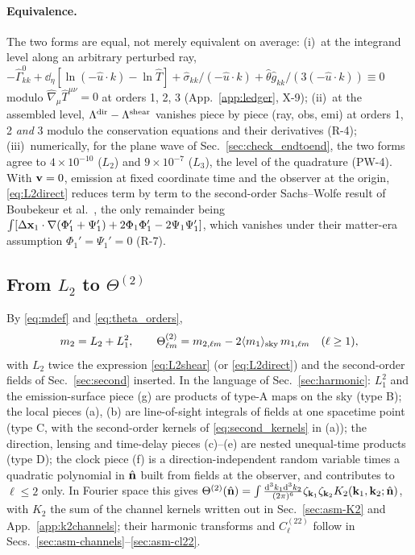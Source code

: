 \paragraph{Equivalence.}  The two forms are equal, not merely equivalent on average:
(i)~at the integrand level along an arbitrary perturbed ray, $-\hat\Gamma^0_{kk}+\dd_\eta[\ln(-\hat u\cdot k)-\ln\hat T]+\hat\sigma_{kk}/(-\hat u\cdot k)
+\hat\theta\hat g_{kk}/(3(-\hat u\cdot k))\equiv0$ modulo $\hat\nabla_\mu\hat T^{\mu\nu}=0$ at orders 1, 2, 3 (App.~\ref{app:ledger}, X-9);
(ii)~at the assembled level, $\Lambda^{\rm dir}-\Lambda^{\rm shear}$ vanishes piece by piece (ray, obs, emi) at orders 1, 2 \emph{and} 3
modulo the conservation equations and their derivatives (R-4); (iii)~numerically, for the plane wave of Sec.~\ref{sec:check_endtoend},
the two forms agree to $4\times10^{-10}$ ($L_2$) and $9\times10^{-7}$ ($L_3$), the level of the quadrature (PW-4).  With
$\mathbf v=0$, emission at fixed coordinate time and the observer at the origin, \eqref{eq:L2direct} reduces term by term to the
second-order Sachs--Wolfe result of Boubekeur et al.\ \cite{Boubekeur}, the only remainder being
$\int[\Delta\mathbf x_1\cdot\nabla(\Phi_1'+\Psi_1')+2\Phi_1\Phi_1'-2\Psi_1\Psi_1']$, which vanishes under their matter-era assumption
$\Phi_1'=\Psi_1'=0$ (R-7).

\subsection{From \texorpdfstring{$L_2$}{L2} to \texorpdfstring{$\Theta^{(2)}$}{Theta2}}
\label{sec:theta2}
By \eqref{eq:mdef} and \eqref{eq:theta_orders},
\begin{equation}
m_2=L_2+L_1^2,\qquad \Theta^{(2)}_{\ell m}=m_{2,\ell m}-2\langle m_1\rangle_{\rm sky}\,m_{1,\ell m}\quad(\ell\ge1),
\label{eq:theta2}
\end{equation}
with $L_2$ twice the expression \eqref{eq:L2shear} (or \eqref{eq:L2direct}) and the second-order fields of
Sec.~\ref{sec:second} inserted.  In the language of Sec.~\ref{sec:harmonic}: $L_1^2$ and the emission-surface piece (g) are
products of type-A maps on the sky (type B); the local pieces (a), (b) are line-of-sight integrals of fields at one spacetime
point (type C, with the second-order kernels of \eqref{eq:second_kernels} in (a)); the direction, lensing and time-delay
pieces (c)--(e) are nested unequal-time products (type D); the clock piece (f) is a direction-independent random variable times
a quadratic polynomial in $\hat{\mathbf n}$ built from fields at the observer, and contributes to $\ell\le2$ only.  In Fourier space this gives
$\Theta^{(2)}(\hat{\mathbf n})=\int\frac{\mathrm d^3k_1\mathrm d^3k_2}{(2\pi)^6}\zeta_{\mathbf k_1}\zeta_{\mathbf k_2}K_2(\mathbf k_1,\mathbf k_2;\hat{\mathbf n})$, with $K_2$ the sum of the channel kernels
written out in Sec.~\ref{sec:asm-K2} and App.~\ref{app:k2channels}; their harmonic transforms and $C^{(22)}_\ell$ follow in
Secs.~\ref{sec:asm-channels}--\ref{sec:asm-cl22}.
